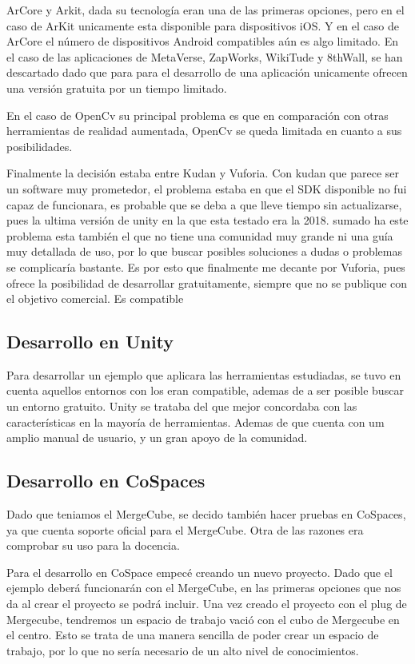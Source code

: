 ArCore y Arkit, dada su tecnología eran una de las primeras opciones, pero en el caso de ArKit unicamente esta disponible para dispositivos iOS. Y en el caso de ArCore el número de dispositivos Android compatibles aún es algo limitado.
En el caso de las aplicaciones de MetaVerse, ZapWorks, WikiTude y 8thWall, se han descartado dado que para para el desarrollo de una aplicación unicamente ofrecen una versión gratuita por un tiempo limitado.

En el caso de OpenCv su principal problema es que en comparación con otras herramientas de realidad aumentada, OpenCv se queda limitada en cuanto a sus posibilidades.

Finalmente la decisión estaba entre Kudan y Vuforia. Con kudan que parece ser un software muy prometedor, el problema estaba en que el SDK disponible no fui capaz de funcionara, es probable que se deba a que lleve tiempo sin actualizarse, pues la ultima versión de unity en la que esta testado era la 2018. sumado ha este problema esta también el que no tiene una comunidad muy grande ni una guía muy detallada de uso, por lo que buscar posibles soluciones a dudas o problemas se complicaría bastante.
Es por esto que finalmente me decante por Vuforia, pues  ofrece la posibilidad de desarrollar gratuitamente, siempre que no se publique con el objetivo comercial. Es compatible 


\subsection{Desarrollo en Unity}
Para desarrollar un ejemplo que aplicara las herramientas estudiadas, se tuvo en cuenta aquellos entornos con los eran compatible, ademas de a ser posible buscar un entorno gratuito. Unity se trataba del que mejor concordaba con las características en la mayoría de herramientas. Ademas de que cuenta con um amplio manual de usuario, y un gran apoyo de la comunidad.

\subsection{Desarrollo en CoSpaces}
Dado que teniamos el MergeCube, se decido también hacer pruebas en CoSpaces, ya que cuenta soporte oficial para el MergeCube. Otra de las razones era comprobar su uso para la docencia.

Para el desarrollo en CoSpace empecé creando un nuevo proyecto. Dado que el ejemplo deberá funcionarán con el MergeCube, en las primeras opciones que nos da al crear el proyecto se podrá incluir.
Una vez creado el proyecto con el plug de Mergecube, tendremos un espacio de trabajo vació con el cubo de Mergecube en el centro. Esto se trata de una manera sencilla de poder crear un espacio de trabajo, por lo que no sería necesario de un alto nivel de conocimientos.


